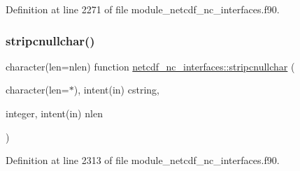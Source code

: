 Definition at line 2271 of file module\+\_\+netcdf\+\_\+nc\+\_\+interfaces.\+f90.

\mbox{\label{namespacenetcdf__nc__interfaces_a2354fd83a30b4ba3b0e9d81003debc5a}} 
\subsubsection{\texorpdfstring{stripcnullchar()}{stripcnullchar()}}
{\footnotesize\ttfamily character(len=nlen) function \hyperlink{interfacenetcdf__nc__interfaces_1_1stripcnullchar}{netcdf\+\_\+nc\+\_\+interfaces\+::stripcnullchar} (\begin{DoxyParamCaption}\item[{character(len=$\ast$), intent(in)}]{cstring,  }\item[{integer, intent(in)}]{nlen }\end{DoxyParamCaption})}



Definition at line 2313 of file module\+\_\+netcdf\+\_\+nc\+\_\+interfaces.\+f90.

